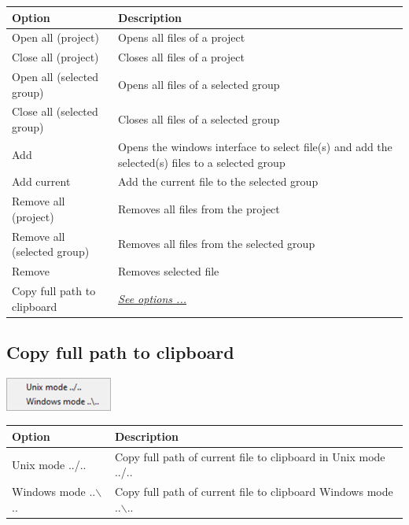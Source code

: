 \begin{scriptsize}\begin{tabularx}{\textwidth}{>{\hsize=0.4\hsize}X>{\hsize=0.7\hsize}X}\\
    \hline
    \textbf{Option} & \textbf{Description} \\
    \hline
    Open all (project) & Opens all files of a project \\
    Close all (project) & Closes all files of a project \\
    \hdashline[1pt/1pt]
    Open all (selected group) & Opens all files of a selected group \\
    Close all (selected group) & Closes all files of a selected group \\
    \hdashline[1pt/1pt]
    Add & Opens the windows interface to select file(s) and add the selected(s) files to a selected group \\
    Add current & Add the current file to the selected group \\
    \hdashline[1pt/1pt]
    Remove all (project) & Removes all files from the project \\
    Remove all (selected group) & Removes all files from the selected group \\
    Remove & Removes selected file \\
    \hdashline[1pt/1pt]
    Copy full path to clipboard & \textit{\href{\#menu\_project_file\_copyfullpath}{See options ...}} \\
    \hline
  \end{tabularx}\end{scriptsize}

\hypertarget{menu_project_file_copyfullpath}{}
\subsection{Copy full path to clipboard}

\includegraphics[scale=0.50]{./res/menu_file_copyfullpathtoclipboard.png}\\

\begin{scriptsize}
  \begin{tabularx}{\textwidth}{>{\hsize=0.3\hsize}X>{\hsize=0.8\hsize}X}\\
    \hline
    \textbf{Option} & \textbf{Description} \\
    \hline
    Unix mode ../.. & Copy full path of current file to clipboard in Unix mode ../.. \\
    Windows mode ..$\backslash$.. & Copy full path of current file to clipboard Windows mode ..$\backslash$.. \\
    \hline
  \end{tabularx}
\end{scriptsize}